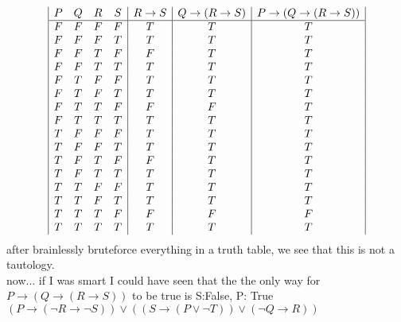 \documentclass[a4paper,12pt]{article}
\begin{document}
\begin{displaymath}
\begin {array} {|c c c c|c|c|c|c|c}
P & Q & R & S & 
R \rightarrow S &
Q \rightarrow(R \rightarrow S) &
P \rightarrow (Q \rightarrow(R \rightarrow S))\\
\hline

F & F & F & F & T & T & T\\
F & F & F & T & T & T & T\\
F & F & T & F & F & T & T\\
F & F & T & T & T & T & T\\
F & T & F & F & T & T & T\\
F & T & F & T & T & T & T\\
F & T & T & F & F & F & T\\
F & T & T & T & T & T & T\\
T & F & F & F & T & T & T\\
T & F & F & T & T & T & T\\
T & F & T & F & F & T & T\\
T & F & T & T & T & T & T\\
T & T & F & F & T & T & T\\
T & T & F & T & T & T & T\\
T & T & T & F & F & F & F\\
T & T & T & T & T & T & T\\

\end{array}
\end{displaymath}
after brainlessly bruteforce everything in a truth table, we see that this is not a tautology.\\
now... if I was smart I could have seen that the the only way for $P \rightarrow (Q \rightarrow(R \rightarrow S))$ to be true is S:False, P: True \\
$(P \rightarrow (\lnot R \rightarrow \lnot S)) \vee ((S \rightarrow (P \vee \lnot T)) \vee (\lnot Q \rightarrow R))$\\
\end{document}

